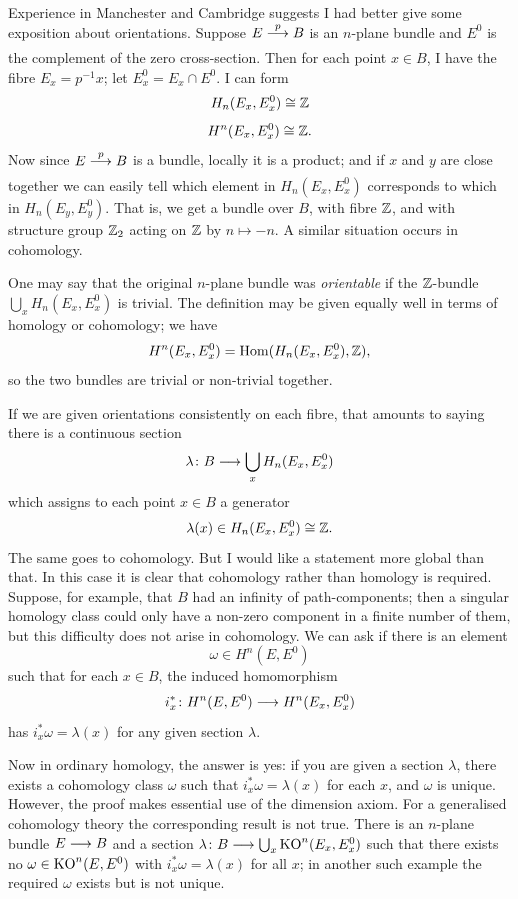 \documentclass[../main]{subfiles}
\begin{document}
Experience in Manchester and Cambridge suggests I had better give some exposition about orientations. Suppose $E\lar{p} B$ is an $n$-plane bundle and $E^0$ is the complement of the zero cross-section. Then for each point $x \in B$, I have the fibre $E_x = p^{-1}x$; let $E^0_x= E_x \cap E^0$. I can form
\[H_n(E_x,E_x^0) \cong \mathbb{Z} \]
\[H^n(E_x, E_x^0) \cong \mathbb{Z}.\]
Now since $E \lar{p} B$ is a bundle, locally it is a product; and if $x$ and $y$ are close together we can easily tell which element in $H_n(E_x,E_x^0)$ corresponds to which in $H_n(E_y,E_y^0)$. That is, we get a bundle over $B$, with fibre $\mathbb{Z}$, and with structure group $\mathbb{Z}_2$ acting on $\mathbb{Z}$ by $n \mapsto -n$. A similar situation occurs in cohomology.

One may say that the original $n$-plane bundle was \emph{orientable} if the $\mathbb{Z}$-bundle $\bigcup_x H_n(E_x,E_x^0)$ is trivial. The definition may be given equally well in terms of homology or cohomology; we have
\[H^n(E_x,E_x^0) = \mathrm{Hom}(H_n(E_x,E_x^0),\mathbb{Z}),\]
so the two bundles are trivial or non-trivial together.

If we are given orientations consistently on each fibre, that amounts to saying there is a continuous section
\[\lambda \colon B \longrightarrow \bigcup_x H_n(E_x,E_x^0)\]
which assigns to each point $x \in B$ a generator 
\[\lambda(x) \in H_n(E_x,E_x^0) \cong \mathbb{Z}.\]
The same goes to cohomology. But I would like a statement more global than that. In this case it is clear that cohomology rather than homology is required. Suppose, for example, that $B$ had an infinity of path-components; then a singular homology class could only have a non-zero component in a finite number of them, but this difficulty does not arise in cohomology. We can ask if there is an element 
\[\omega \in H^n(E,E^0)\]
such that for each $x \in B$, the induced homomorphism 
\[i_x^* \colon H^n(E,E^0) \longrightarrow H^n(E_x,E_x^0)\]
has $i_x^* \omega = \lambda(x)$ for any given section $\lambda$.

Now in ordinary homology, the answer is yes: if you are given a section $\lambda$, there exists a cohomology class $\omega$ such that $i_x^*\omega = \lambda(x)$ for each $x$, and $\omega$ is unique. However, the proof makes essential use of the dimension axiom. For a generalised cohomology theory the corresponding result is not true. There is an $n$-plane bundle $E \longrightarrow B$ and a section $\lambda \colon B \longrightarrow \bigcup_x \mathrm{KO}^n(E_x,E_x^0)$ such that there exists no $\omega \in \mathrm{KO}^n(E,E^0)$ with $i_x^* \omega = \lambda(x)$ for all $x$; in another such example the required $\omega$ exists but is not unique.
\end{document}
